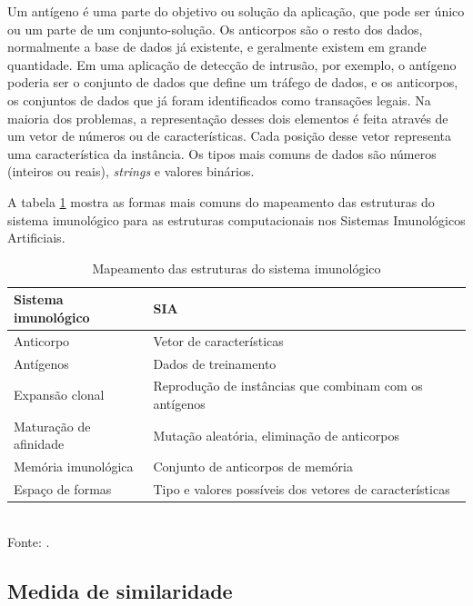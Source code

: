 Um antígeno é uma parte do objetivo ou solução da aplicação, que pode ser único ou um parte de um conjunto-solução. Os anticorpos são o resto dos dados, normalmente a base de dados já existente, e geralmente existem em grande quantidade. Em uma aplicação de detecção de intrusão, por exemplo, o antígeno poderia ser o conjunto de dados que define um tráfego de dados, e os anticorpos, os conjuntos de dados que já foram identificados como transações legais. Na maioria dos problemas, a representação desses dois elementos é feita através de um vetor de números ou de características. Cada posição desse vetor representa uma característica da instância. Os tipos mais comuns de dados são números (inteiros ou reais), \emph{strings} e valores binários.

A tabela \ref{tab:ais_map} mostra as formas mais comuns do mapeamento das estruturas do sistema imunológico para as estruturas computacionais nos Sistemas Imunológicos Artificiais.

\begin{table}[h!]
    \caption{Mapeamento das estruturas do sistema imunológico}
    \label{tab:ais_map}
    \centering
    \begin{tabular}{l l}
        \hline
        Sistema imunológico     & SIA                                                     \\
        \hline
        Anticorpo               & Vetor de características                                \\
        Antígenos               & Dados de treinamento                                    \\
        Expansão clonal         & Reprodução de instâncias que combinam com os antígenos  \\
        Maturação de afinidade  & Mutação aleatória, eliminação de anticorpos             \\
        Memória imunológica     & Conjunto de anticorpos de memória                       \\
        Espaço de formas        & Tipo e valores possíveis dos vetores de características \\
        \hline
    \end{tabular}
    \vspace{0.5cm}
    \\ Fonte: \cite{Andrew2003}.
\end{table}

\subsection{Medida de similaridade}

